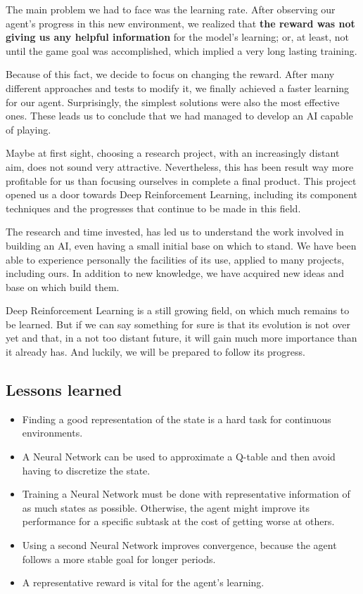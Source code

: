The main problem we had to face was the learning rate. After observing our agent's progress in this new environment, we realized that \textbf{the reward was not giving us any helpful information} for the model's learning; or, at least, not until the game goal was accomplished, which implied a very long lasting training.

Because of this fact, we decide to focus on changing the reward. After many different approaches and tests to modify it, we finally achieved a faster learning for our agent. Surprisingly, the simplest solutions were also the most effective ones. These leads us to conclude that we had managed to develop an AI capable of playing.

Maybe at first sight, choosing a research project, with an increasingly distant aim, does not sound very attractive. Nevertheless, this has been result way more profitable for us than focusing ourselves in complete a final product. This project opened us a door towards Deep Reinforcement Learning, including its component techniques and the progresses that continue to be made in this field.  

The research and time invested, has led us to understand the work involved in building an AI, even having a small initial base on which to stand. We have been able to experience personally the facilities of its use, applied to many projects, including ours. In addition to new knowledge, we have acquired new ideas and base on which build them.

Deep Reinforcement Learning is a still growing field, on which much remains to be learned. But if we can say something for sure is that its evolution is not over yet and that, in a not too distant future, it will gain much more importance than it already has. And luckily, we will be prepared to follow its progress.

\subsection{Lessons learned}

\begin{itemize}
    \item Finding a good representation of the state is a hard task for continuous environments.
    \item A Neural Network can be used to approximate a Q-table and then avoid having to discretize the state.
    \item Training a Neural Network must be done with representative information of as much states as possible. Otherwise, the agent might improve its performance for a specific subtask at the cost of getting worse at others.
    \item Using a second Neural Network improves convergence, because the agent follows a more stable goal for longer periods.
    \item A representative reward is vital for the agent's learning.
\end{itemize}
        

